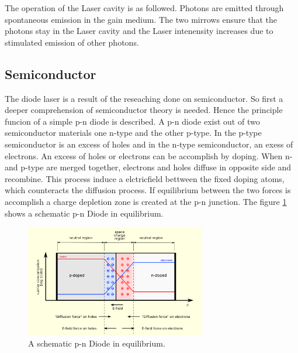 The operation of the Laser cavity is as followed.
Photons are emitted through spontaneous emission
in the gain medium. The two mirrows
ensure that the photons stay in the Laser cavity
and the Laser intenensity increases due to
stimulated emission of other photons.


\subsection{Semiconductor}
\label{subsec:Semiconductor}

The diode laser is a result of the reseaching done on semiconductor.
So first a deeper comprehension of semiconductor theory is needed.
Hence the principle funcion of a simple p-n diode is described.
A p-n diode exist out of two semiconductor materials one
n-type and the other p-type.
In the p-type semiconductor is an excess of holes
and in the n-type semiconductor, an exess of electrons.
An excess of holes or electrons can be accomplish by doping.
When n- and p-type are merged together,
electrons and holes diffuse in opposite side and recombine.
This process induce a elctricfield bettween the fixed doping atoms, which
counteracts the diffusion process.
If equilibrium between the two forces is accomplish
a charge depletion zone is created
at the p-n junction.
The figure \ref{fig:equi} shows
a schematic p-n Diode in equilibrium.

\begin{figure}
\centering
\includegraphics[width=0.7\textwidth]{equilibrium.png}
\caption{A schematic p-n Diode in equilibrium.
\cite{wiki_diode}}
\label{fig:equi}
\end{figure}

